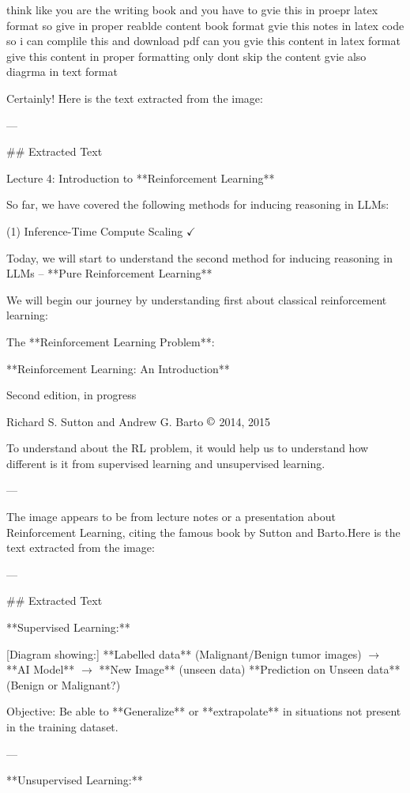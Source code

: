 
think like you are the writing book and you have to gvie this in proepr latex format so give in proper reablde content book format gvie this notes in latex code so i can complile this and download pdf
can you gvie this content in latex format
give this content in proper formatting only dont skip the content gvie also diagrma in text format 

Certainly! Here is the text extracted from the image:

---

## Extracted Text

Lecture 4: Introduction to **Reinforcement Learning**

So far, we have covered the following methods for inducing reasoning in LLMs:

(1) Inference-Time Compute Scaling $\checkmark$

Today, we will start to understand the second method for inducing reasoning in LLMs – **Pure Reinforcement Learning**

We will begin our journey by understanding first about classical reinforcement learning:

The **Reinforcement Learning Problem**:

**Reinforcement Learning: An Introduction**

Second edition, in progress

Richard S. Sutton and Andrew G. Barto
$\copyright$ 2014, 2015

To understand about the RL problem, it would help us to understand how different is it from supervised learning and unsupervised learning.

---

The image appears to be from lecture notes or a presentation about Reinforcement Learning, citing the famous book by Sutton and Barto.Here is the text extracted from the image:

---

## Extracted Text

**Supervised Learning:**

[Diagram showing:] **Labelled data** (Malignant/Benign tumor images) $\to$ **AI Model** $\to$ **New Image** (unseen data) **Prediction on Unseen data** (Benign or Malignant?)

Objective: Be able to **Generalize** or **extrapolate** in situations not present in the training dataset.

---

**Unsupervised Learning:**

